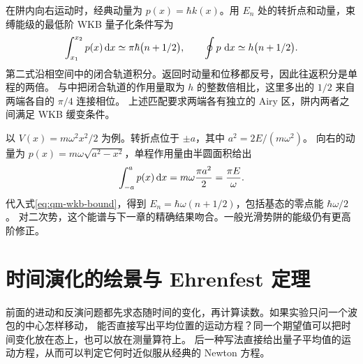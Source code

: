 在阱内向右运动时，经典动量为 $p(x) = \hbar k(x)$。用 $E_n$ 处的转折点和动量，束缚能级的最低阶 WKB 量子化条件写为
\begin{equation}
    \int_{x_1}^{x_2}p(x)\mathop{}\!\mathrm{d} x \simeq \pi\hbar\bigl(n + 1/2\bigr),
    \qquad
    \oint p\,\mathop{}\!\mathrm{d} x \simeq h\bigl(n + 1/2\bigr).
    \label{eq:qm-wkb-bound}
\end{equation}
第二式沿相空间中的闭合轨道积分。返回时动量和位移都反号，因此往返积分是单程的两倍。
与中把闭合轨道的作用量取为 $h$ 的整数倍相比，这里多出的 $1/2$ 来自两端各自的 $\pi/4$ 连接相位。
上述匹配要求两端各有独立的 Airy 区，阱内两者之间满足 WKB 缓变条件。

以 $V(x) = m\omega^2x^2/2$ 为例。转折点位于 $\pm a$，其中 $a^2 = 2E/(m\omega^2)$。
向右的动量为 $p(x) = m\omega\sqrt{a^2 - x^2}$，单程作用量由半圆面积给出
\[
    \int_{-a}^a p(x)\mathop{}\!\mathrm{d} x = m\omega\frac{\pi a^2}{2} = \frac{\pi E}{\omega}.
\]
代入式\eqref{eq:qm-wkb-bound}，得到 $E_n = \hbar\omega(n + 1/2)$，包括基态的零点能 $\hbar\omega/2$。
对二次势，这个能谱与下一章的精确结果吻合。一般光滑势阱的能级仍有更高阶修正。

\section{时间演化的绘景与 Ehrenfest 定理}
前面的进动和反演问题都先求态随时间的变化，再计算读数。如果实验只问一个波包的中心怎样移动，
能否直接写出平均位置的运动方程？同一个期望值可以把时间变化放在态上，也可以放在测量算符上。
后一种写法直接给出量子平均值的运动方程，从而可以判定它何时近似服从经典的 Newton 方程。

